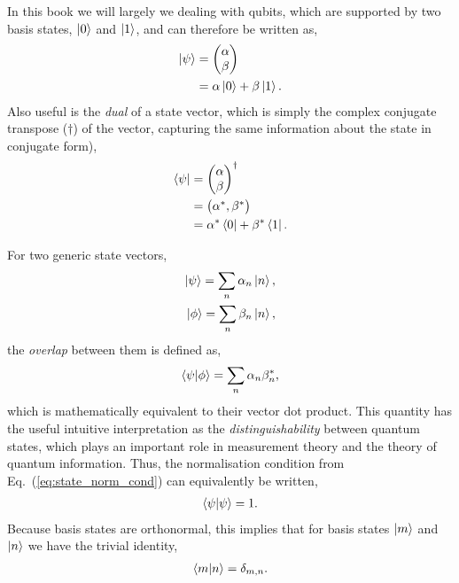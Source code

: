 \documentclass[aps,pra,twocolumn,amsmath,amssymb,nofootinbib,superscriptaddress]{revtex4}
\begin{document}
In this book we will largely we dealing with qubits, which are supported by two basis states, $\ket{0}$ and $\ket{1}$, and can therefore be written as,
\begin{align}
\ket\psi &= \left(\begin{matrix}{}
	\alpha \\
	\beta
\end{matrix}\right)\nonumber\\
&= \alpha\ket{0} + \beta\ket{1}.
\end{align}
Also useful is the \textit{dual} of a state vector, which is simply the complex conjugate transpose ($\dag$) of the vector, capturing the same information about the state in conjugate form),
\begin{align}
\bra\psi &= \left(\begin{matrix}{}
	\alpha \\
	\beta
\end{matrix}\right)^\dag\nonumber\\
&=\left(\begin{matrix}{}
	\alpha^*, \beta^*
\end{matrix}\right)\nonumber\\
&= \alpha^*\bra{0} + \beta^*\bra{1}.
\end{align}

For two generic state vectors,
\begin{align}
	\ket\psi = \sum_n \alpha_n \ket{n},\nonumber\\
	\ket\phi = \sum_n \beta_n \ket{n},
\end{align}
the \textit{overlap} between them is defined as,
\begin{align}
\braket{\psi|\phi} = \sum_n \alpha_n\beta_n^*,
\end{align}
which is mathematically equivalent to their vector dot product. This quantity has the useful intuitive interpretation as the \textit{distinguishability} between quantum states, which plays an important role in measurement theory and the theory of quantum information. Thus, the normalisation condition from Eq.~(\ref{eq:state_norm_cond}) can equivalently be written,
\begin{align}
\braket{\psi|\psi} = 1.	
\end{align}
Because basis states are orthonormal, this implies that for basis states $\ket{m}$ and $\ket{n}$ we have the trivial identity,
\begin{align}
	\braket{m|n}=\delta_{m,n}.
\end{align}
\end{document}
